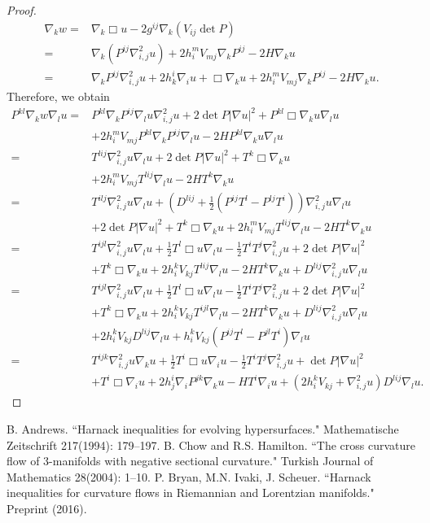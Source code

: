 \documentclass{amsart}
\theoremstyle{definition}
\theoremstyle{remark}
\numberwithin{equation}{section}
\begin{document}
\begin{proof}
\begin{align*}
\nabla_k w=&\nabla_k\Box u-2g^{ij}\nabla_k(V_{ij}\det P)\\
=&\nabla_k(P^{ij}\nabla^2_{i,j} u)+2h_i^mV_{mj}\nabla_kP^{ij}-2H\nabla_ku\\
=&\nabla_kP^{ij}\nabla^2_{i,j}u+2h_k^i\nabla_iu+\Box\nabla_ku+2h_i^mV_{mj}\nabla_kP^{ij}-2H\nabla_ku.
\end{align*}
Therefore, we obtain
\begin{align*}
P^{kl}\nabla_k w\nabla_lu
=&P^{kl}\nabla_kP^{ij}\nabla_lu\nabla^2_{i,j}u+2\det P|\nabla u|^2+P^{kl}\Box\nabla_ku\nabla_lu\\
&+2h_i^mV_{mj}P^{kl}\nabla_kP^{ij}\nabla_lu-2HP^{kl}\nabla_ku\nabla_lu\\
=&T^{lij}\nabla^2_{i,j}u\nabla_lu+2\det P|\nabla u|^2+T^{k}\Box\nabla_ku\\
&+2h_i^mV_{mj}T^{lij}\nabla_lu-2HT^{k}\nabla_ku\\
=& {T^{ilj}\nabla^2_{i,j}u\nabla_lu}+\left(D^{lij}+\frac{1}{2}\left(P^{ij}T^l-P^{lj}T^i\right)\right)\nabla^2_{i,j}u\nabla_lu\\
&+2\det P|\nabla u|^2+ {T^{k}\Box\nabla_ku}+2h_i^mV_{mj}T^{lij}\nabla_lu-2HT^{k}\nabla_ku\\
=& {T^{ijl}\nabla^2_{i,j}u\nabla_lu}+\frac{1}{2}T^l\Box u\nabla_lu-\frac{1}{2}T^iT^j\nabla^2_{i,j}u+2\det P|\nabla u|^2\\
&+{T^{k}\Box\nabla_ku}+2h_i^kV_{kj}T^{lij}\nabla_lu-2HT^{k}\nabla_ku+D^{lij}\nabla^2_{i,j}u\nabla_lu\\
=&{T^{ijl}\nabla^2_{i,j}u\nabla_lu}+\frac{1}{2}T^l\Box u\nabla_lu-\frac{1}{2}T^iT^j\nabla^2_{i,j}u+2\det P|\nabla u|^2\\
&+{T^{k}\Box\nabla_ku}+2h_i^kV_{kj}T^{ijl}\nabla_lu-2HT^{k}\nabla_ku+D^{lij}\nabla^2_{i,j}u\nabla_lu\\
&+2h_i^kV_{kj}D^{lij}\nabla_lu+h_i^kV_{kj}(P^{ij}T^l-P^{jl}T^i)\nabla_lu\\
=&{T^{ijk}\nabla^2_{i,j}u\nabla_ku}+\frac{1}{2}T^i\Box u\nabla_iu-\frac{1}{2}T^iT^j\nabla^2_{i,j}u+\det P|\nabla u|^2\\
&+{T^i\Box\nabla_iu}+2h_{j}^i\nabla_iP^{jk}\nabla_ku-HT^{i}\nabla_iu+\left(2h_i^kV_{kj}+\nabla^2_{i,j}u\right)D^{lij}\nabla_lu.
\end{align*}
\end{proof}


\begin{thebibliography}{10}
 B. Andrews. ``Harnack inequalities for evolving hypersurfaces." Mathematische Zeitschrift 217(1994): 179--197.
 B. Chow and R.S. Hamilton. ``The cross curvature flow of 3-manifolds with negative sectional curvature." Turkish Journal of Mathematics 28(2004): 1--10.
 P. Bryan, M.N. Ivaki, J. Scheuer. ``Harnack inequalities for curvature flows in Riemannian and Lorentzian manifolds." Preprint (2016).
\end{thebibliography}
\end{document}
